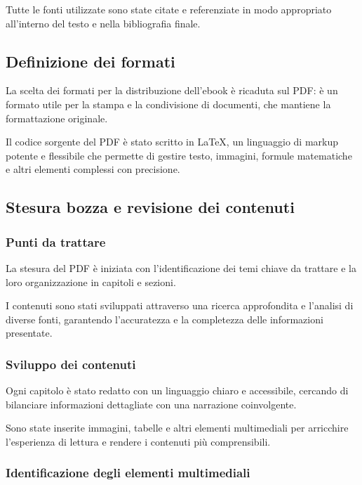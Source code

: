 \documentclass[a4paper,12pt]{report}
\begin{document}
Tutte le fonti utilizzate sono state citate e referenziate in modo appropriato all'interno del testo e nella bibliografia finale.

\subsection{Definizione dei formati}

La scelta dei formati per la distribuzione dell'ebook è ricaduta sul PDF: è un formato utile per la stampa e la condivisione di documenti, che mantiene la formattazione originale.

Il codice sorgente del PDF è stato scritto in LaTeX, un linguaggio di markup potente e flessibile che permette di gestire testo, immagini, formule matematiche e altri elementi complessi con precisione. 

\subsection{Stesura bozza e revisione dei contenuti}

\subsubsection{Punti da trattare}

La stesura del PDF è iniziata con l'identificazione dei temi chiave da trattare e la loro organizzazione in capitoli e sezioni. 

I contenuti sono stati sviluppati attraverso una ricerca approfondita e l'analisi di diverse fonti, garantendo l'accuratezza e la completezza delle informazioni presentate.

\subsubsection{Sviluppo dei contenuti}

Ogni capitolo è stato redatto con un linguaggio chiaro e accessibile, cercando di bilanciare informazioni dettagliate con una narrazione coinvolgente. 

Sono state inserite immagini, tabelle e altri elementi multimediali per arricchire l'esperienza di lettura e rendere i contenuti più comprensibili.

\subsubsection{Identificazione degli elementi multimediali}
\end{document}
